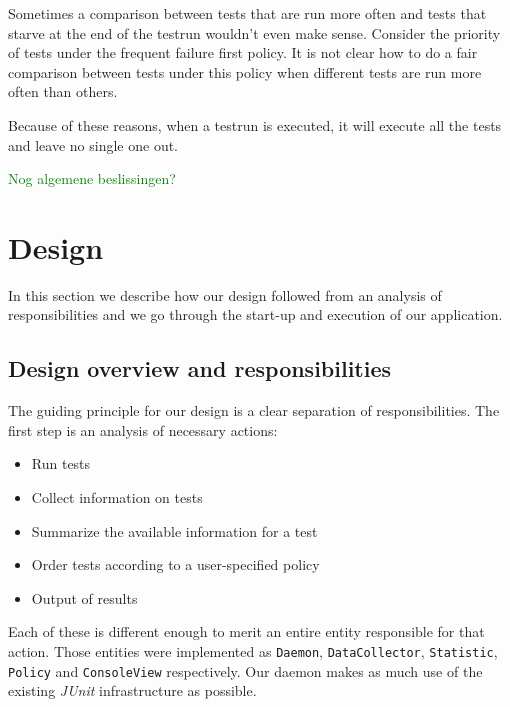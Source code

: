 \documentclass[i2]{oss}
\newcommand{\class}[1]{\texttt{#1}}
\newcommand{\junit}{\emph{JUnit }}
\newcommand{\comment}[1]{{\huge \textcolor{green}{#1}}\\}
\begin{document}
Sometimes a comparison between tests that are run more often and tests that starve at the end of the testrun wouldn't even make sense.
Consider the priority of tests under the frequent failure first policy.
It is not clear how to do a fair comparison between tests under this policy when different tests are run more often than others.

Because of these reasons, when a testrun is executed, it will execute all the tests and leave no single one out.

\comment{Nog algemene beslissingen?}

\section{Design}
\label{ssec:design}

In this section we describe how our design followed from an analysis
of responsibilities and we go through the start-up and execution of 
our application.

\subsection{Design overview and responsibilities}
\label{subssec: Design overview}

The guiding principle for our design is a clear separation of 
responsibilities. The first step is an analysis of necessary actions:

\begin{itemize}
	\item Run tests
    \item Collect information on tests
    \item Summarize the available information for a test
    \item Order tests according to a user-specified policy
    \item Output of results
\end{itemize}

Each of these is different enough to merit an entire entity responsible 
for that action. Those entities were implemented as \class{Daemon},
\class{DataCollector}, \class{Statistic}, \class{Policy} and
\class{ConsoleView} respectively. Our daemon makes as much use of the 
existing \junit infrastructure as possible. 
\end{document}

